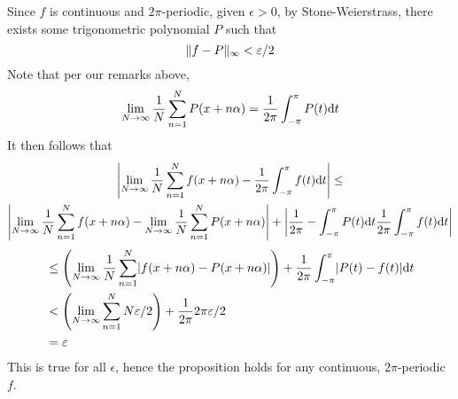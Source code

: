 \documentclass[a4paper, 12pt]{article}
\begin{document}
\begin{solution}
Since $f$ is continuous and $2\pi$-periodic, given $\epsilon > 0$, by Stone-Weierstrass, there exists some trigonometric polynomial $P$ such that \begin{equation*}
\norm{f - P}_{\infty} < \epsilon/2
\end{equation*}
Note that per our remarks above, \begin{equation*}
    \lim_{N \to \infty} \frac{1}{N} \sum_{n=1}^{N} P(x + n \alpha)= \frac{1}{2\pi} \int_{-\pi}^{\pi} P(t) \dt  
\end{equation*}
It then follows that \begin{multline*}
    \abs*{\lim_{N \to \infty} \frac{1}{N} \sum_{n=1}^{N} f(x + n \alpha) - \frac{1}{2\pi} \int_{-\pi}^{\pi} f(t) \dt} \leq \\  \abs*{\lim_{N \to \infty} \frac{1}{N} \sum_{n=1}^{N} f(x + n \alpha) - \lim_{N \to \infty} \frac{1}{N} \sum_{n=1}^{N} P(x + n \alpha)} + \abs*{\frac{1}{2\pi} - \int_{-\pi}^{\pi} P(t) \dt   \frac{1}{2\pi} \int_{-\pi}^{\pi} f(t) \dt}
\end{multline*}
\begin{align*}
    &\leq \left(\lim_{N \to \infty} \frac{1}{N} \sum_{n=1}^{N} \abs*{f(x + n\alpha) - P(x + n\alpha)}\right) + \frac{1}{2\pi} \int_{-\pi}^{\pi} \abs*{P(t) - f(t)} \dt \\
    &< \left(\lim_{N \to \infty} \sum_{n=1}^{N} N\epsilon/2\right) + \frac{1}{2\pi} 2\pi \epsilon/2 \\
    &= \epsilon
\end{align*}
This is true for all $\epsilon$, hence the proposition holds for any continuous, $2\pi$-periodic $f$.
\end{solution}
\end{document}
